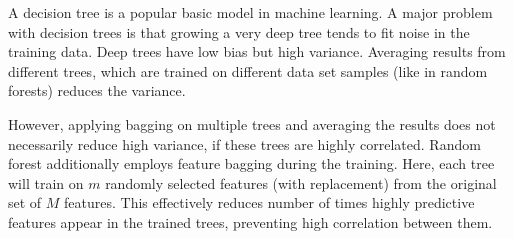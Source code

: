 A decision tree is a popular basic model in machine learning.  A major problem
with decision trees is that growing a very deep tree tends to fit noise in the
training data.  Deep trees have low bias but high variance.  Averaging results
from different trees, which are trained on different data set samples (like in
random forests) reduces the variance.

However, applying bagging on multiple trees and averaging the results does not
necessarily reduce high variance, if these trees are highly correlated.  Random
forest additionally employs feature bagging during the training.  Here, each
tree will train on $m$ randomly selected features (with replacement) from the
original set of $M$ features.  This effectively reduces number of times highly
predictive features appear in the trained trees, preventing high correlation
between them.

